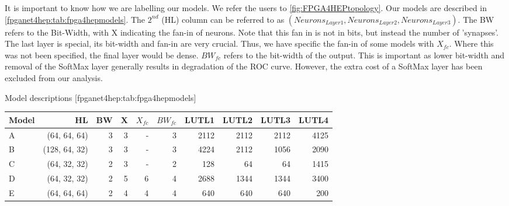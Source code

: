 It is important to know how we are labelling our models. We refer the users to \cref{fig:FPGA4HEPtopology}. Our models are described in \cref{fpganet4hep:tab:fpga4hepmodels}. The $2^{nd}$ (HL) column can be referred to as $(Neurons_{Layer1}, Neurons_{Layer2}, Neurons_{Layer3})$. The BW refers to the Bit-Width, with X indicating the fan-in of neurons. Note that this fan in is not in bits, but instead the number of 'synapses'. The last layer is special, its bit-width and fan-in are very crucial. Thus, we have specific the fan-in of some models with $X_{fc}$. Where this was not been specified, the final layer would be dense. $BW_{fc}$ refers to the bit-width of the output. This is important as lower bit-width and removal of the SoftMax layer generally results in degradation of the ROC curve. However, the extra cost of a SoftMax layer has been excluded from our analysis.




% 

% 
\begin{table}
    \begin{sidecaption}{%
        Model descriptions
    }[fpganet4hep:tab:fpga4hepmodels]
\begin{threeparttable}
\begin{tabular}{lrrrrrrrrr}
\hline
Model & HL            & BW & X & $X_{fc}$ & $BW_{fc}$   & LUTL1 & LUTL2 & LUTL3 & LUTL4 \\ \hline
A     & (64, 64, 64)  & 3  & 3 & -         & 3          & 2112  & 2112  & 2112  & 4125  \\
B     & (128, 64, 32) & 3  & 3 & -         & 3          & 4224  & 2112  & 1056  & 2090  \\
C     & (64, 32, 32)  & 2  & 3 & -         & 2          & 128   & 64    & 64    & 1415  \\ 
D     & (64, 32, 32)  & 2  & 5 & 6         & 4          & 2688  & 1344  & 1344  & 3400  \\ 
E     & (64, 64, 64)  & 2  & 4 & 4         & 4          & 640   & 640   & 640   & 200   \\\hline 
\end{tabular}
\end{threeparttable}
\end{sidecaption}
\end{table}

